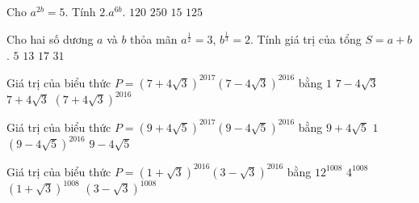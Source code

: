 \begin{ex}
	Cho $a^{2b}=5$. Tính $2.a^{6b}$.
	\choice
	{$120$}
	{\True $250$}
	{$15$}
	{$125$}
\end{ex}

\begin{ex}
	Cho hai số dương $a$ và $b$ thỏa mãn $a^{\tfrac{1}{2}}=3$, $b^{\tfrac{1}{3}}=2$. Tính giá trị của tổng $S=a+b$.
	\choice
	{$5$}
	{$13$}
	{\True $17$}
	{$31$}
\end{ex}

\begin{ex}
	Giá trị của biểu thức $P=\left( 7+4\sqrt{3} \right)^{2017}\left( 7-4\sqrt{3} \right)^{2016}$ bằng
	\choice
	{$1$}
	{$7-4\sqrt{3}$}
	{\True $7+4\sqrt{3}$}
	{$\left( 7+4\sqrt{3} \right)^{2016}$}
\end{ex}

\begin{ex}%
	Giá trị của biểu thức $P=\left( 9+4\sqrt{5} \right)^{2017}\left( 9-4\sqrt{5} \right)^{2016}$ bằng
	\choice
	{\True $9+4\sqrt{5}$}
	{$1$}
	{$\left( 9-4\sqrt{5} \right)^{2016}$}
	{$9-4\sqrt{5}$}
\end{ex}

\begin{ex}%
	Giá trị của biểu thức $P=\left( 1+\sqrt{3} \right)^{2016}\left( 3-\sqrt{3} \right)^{2016}$ bằng
	\choice
	{\True $12^{1008}$}
	{$4^{1008}$}
	{$\left( 1+\sqrt{3} \right)^{1008}$}
	{$\left( 3-\sqrt{3} \right)^{1008}$}
\end{ex}


